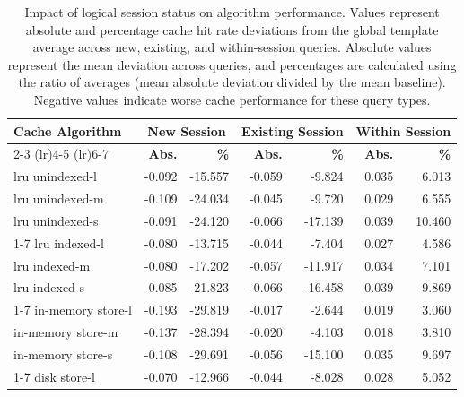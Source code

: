 \begin{table}[b]
\centering
\caption{
    Impact of logical session status on algorithm performance. 
    Values represent absolute and percentage cache hit rate deviations from the global template average across 
    new, existing, and within-session queries. Absolute values represent the mean deviation across queries, 
    and percentages are calculated using the ratio of averages (mean absolute deviation divided by the mean baseline). 
    Negative values indicate worse cache performance for these query types.
}
\label{tab:performance_differences}
\begin{tabular*}{\textwidth}{@{\extracolsep{\fill}} l r@{\hspace{1em}}r r@{\hspace{1em}}r r@{\hspace{1em}}r @{}}
\toprule
\textbf{Cache Algorithm} & \multicolumn{2}{c}{\textbf{New Session}} & \multicolumn{2}{c}{\textbf{Existing Session}} & \multicolumn{2}{c}{\textbf{Within Session}} \\
\cmidrule(lr){2-3} \cmidrule(lr){4-5} \cmidrule(lr){6-7}
& \textbf{Abs.} & \textbf{\%} & \textbf{Abs.} & \textbf{\%} & \textbf{Abs.} & \textbf{\%} \\
\midrule
lru unindexed-l        & -0.092 & -15.557 & -0.059 &  -9.824 &  0.035 &  6.013 \\
lru unindexed-m        & -0.109 & -24.034 & -0.045 &  -9.720 &  0.029 &  6.555 \\
lru unindexed-s        & -0.091 & -24.120 & -0.066 & -17.139 &  0.039 & 10.460 \\
\cmidrule(lr){1-7}
lru indexed-l            & -0.080 & -13.715 & -0.044 &  -7.404 &  0.027 &  4.586 \\
lru indexed-m            & -0.080 & -17.202 & -0.057 & -11.917 &  0.034 &  7.101 \\
lru indexed-s            & -0.085 & -21.823 & -0.066 & -16.458 &  0.039 &  9.869 \\
\cmidrule(lr){1-7}
in-memory store-l            & -0.193 & -29.819 & -0.017 &  -2.644 &  0.019 &  3.060 \\
in-memory store-m            & -0.137 & -28.394 & -0.020 &  -4.103 &  0.018 &  3.810 \\
in-memory store-s            & -0.108 & -29.691 & -0.056 & -15.100 &  0.035 &  9.697 \\
\cmidrule(lr){1-7}
disk store-l             & -0.070 & -12.966 & -0.044 & -8.028  & 0.028   & 5.052 \\
\bottomrule
\end{tabular*}
\end{table}



